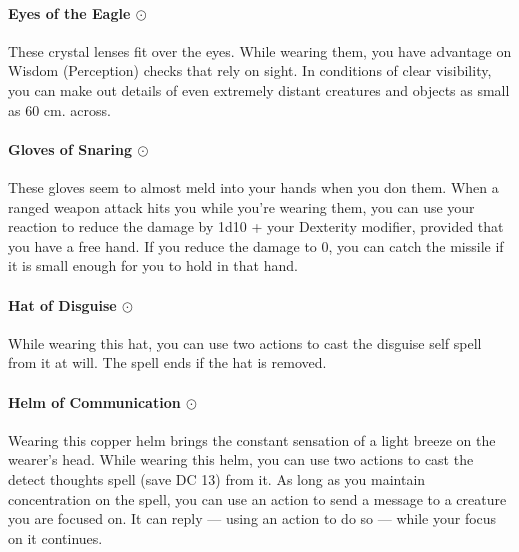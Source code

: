     \paragraph{Eyes of the Eagle $\odot$}
        These crystal lenses fit over the eyes.
        While wearing them, you have advantage on Wisdom (Perception) checks that rely on sight.
        In conditions of clear visibility, you can make out details of even extremely distant creatures and objects as small as 60 cm. across.
    \paragraph{Gloves of Snaring $\odot$}
        These gloves seem to almost meld into your hands when you don them.
        When a ranged weapon attack hits you while you're wearing them, you can use your reaction to reduce the damage by 1d10 + your Dexterity modifier, provided that you have a free hand.
        If you reduce the damage to 0, you can catch the missile if it is small enough for you to hold in that hand.
    \paragraph{Hat of Disguise $\odot$}
        While wearing this hat, you can use two actions to cast the disguise self spell from it at will.
        The spell ends if the hat is removed.
    \paragraph{Helm of Communication $\odot$}
        Wearing this copper helm brings the constant sensation of a light breeze on the wearer's head.
        While wearing this helm, you can use two actions to cast the detect thoughts spell (save DC 13) from it.
        As long as you maintain concentration on the spell, you can use an action to send a message to a creature you are focused on.
        It can reply --- using an action to do so --- while your focus on it continues.

